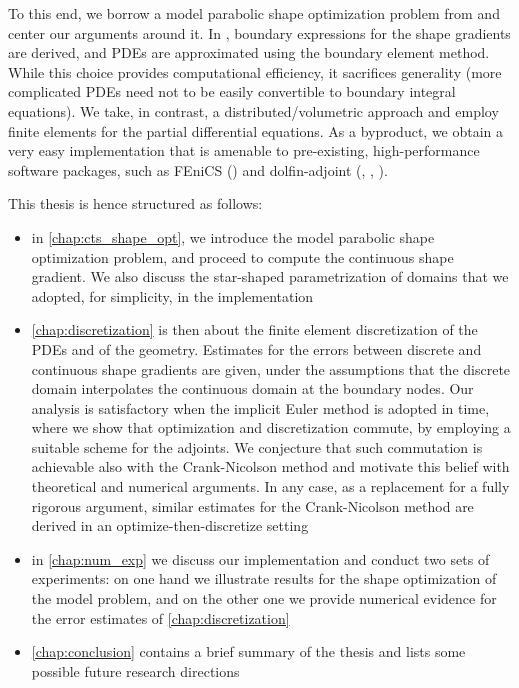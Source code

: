 \documentclass[english,a4paper,9pt,oneside]{scrbook}	%
\theoremstyle{break}
\theoremstyle{remark}
\begin{document}
To this end, we borrow a model parabolic shape optimization problem from \cite{harbrecht} and center our arguments around it. In \cite{harbrecht}, boundary expressions for the shape gradients are derived, and PDEs are approximated using the boundary element method. While this choice provides computational efficiency, it sacrifices generality (more complicated PDEs need not to be easily convertible to boundary integral equations). We take, in contrast, a distributed/volumetric approach and employ finite elements for the partial differential equations. As a byproduct, we obtain a very easy implementation that is amenable to pre-existing, high-performance software packages, such as FEniCS (\cite{fenics}) and dolfin-adjoint (\cite{dolfin-adjoint_1}, \cite{dolfin-adjoint_2}, \cite{dolfin-adjoint_3}). 

This thesis is hence structured as follows:

\begin{itemize}
	\item in \cref{chap:cts_shape_opt}, we introduce the model parabolic shape optimization problem, and proceed to compute the continuous shape gradient. We also discuss the star-shaped parametrization of domains that we adopted, for simplicity, in the implementation
	\item \cref{chap:discretization} is then about the finite element discretization of the PDEs and of the geometry. Estimates for the errors between discrete and continuous shape gradients are given, under the assumptions that the discrete domain interpolates the continuous domain at the boundary nodes. Our analysis is satisfactory when the implicit Euler method is adopted in time, where we show that optimization and discretization commute, by employing a suitable scheme for the adjoints. We conjecture that such commutation is achievable also with the Crank-Nicolson method and motivate this belief with theoretical and numerical arguments. In any case, as a replacement for a fully rigorous argument, similar estimates for the Crank-Nicolson method are derived in an optimize-then-discretize setting
	\item in \cref{chap:num_exp} we discuss our implementation and conduct two sets of experiments: on one hand we illustrate results for the shape optimization of the model problem, and on the other one we provide numerical evidence for the error estimates of \cref{chap:discretization}
	\item \cref{chap:conclusion} contains a brief summary of the thesis and lists some possible future research directions
\end{itemize}
\end{document}
